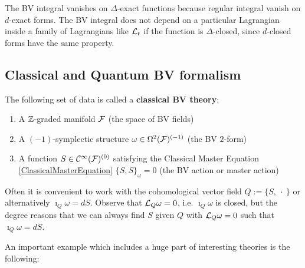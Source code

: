 The BV integral vanishes on $\Delta$-exact functions because regular integral vanish on $d$-exact forms. The BV integral does not depend on a particular Lagrangian inside a family of Lagrangians like $\mathcal{L}_t$ if the function is $\Delta$-closed, since $d$-closed forms have the same property.

\subsection{Classical and Quantum BV formalism}

\begin{definition}[BV Theory]
  The following set of data is called a \textbf{classical BV theory}:
  \begin{enumerate}
    \item A $\mathbb{Z}$-graded manifold ${\mathcal{F}}$ (the space of BV fields)
    \item A $(-1)$-symplectic structure $\omega \in \Omega^2({\mathcal{F}})^{(-1)}$ (the BV $2$-form)
    \item A function $S \in \mathcal{C}^{\infty}({\mathcal{F}})^{(0)}$ satisfying the Classical Master Equation \ref{ClassicalMasterEquation} $\{S, S\}_\omega = 0$ (the BV action or master action)
  \end{enumerate}
\end{definition}

\begin{rem}
  Often it is convenient to work with the cohomological vector field $Q := \{S, \ \cdot \ \}$ or alternatively $\imath_Q \omega = dS$. Observe that $\mathcal{L}_{Q} \omega = 0$, i.e. $\imath_Q \omega$ is closed, but the degree reasons that we can always find $S$ given $Q$ with $\mathcal{L}_{Q} \omega = 0$ such that $\imath_Q \omega = dS$.
\end{rem}

An important example which includes a huge part of interesting theories is the following:

